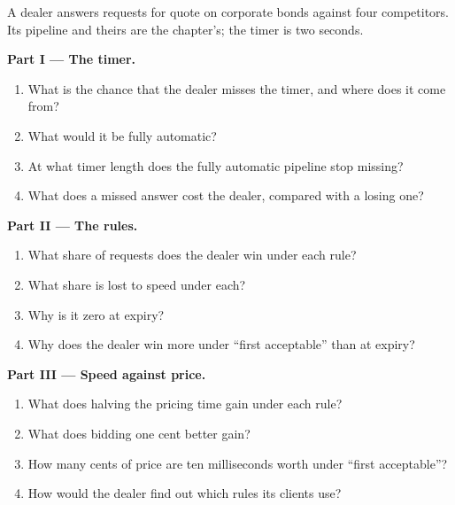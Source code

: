 \begin{problem}\label{pb:nw:fixed-income-and-rfq-platform-connectivity:1}
A dealer answers requests for quote on corporate bonds against four competitors. Its pipeline and theirs are the chapter's; the timer
is two seconds.

\medskip\noindent\textbf{Part I --- The timer.}
\begin{enumerate}
\item What is the chance that the dealer misses the timer, and where does it come from?
\item What would it be fully automatic?
\item At what timer length does the fully automatic pipeline stop missing?
\item What does a missed answer cost the dealer, compared with a losing one?
\end{enumerate}

\medskip\noindent\textbf{Part II --- The rules.}
\begin{enumerate}[resume]
\item What share of requests does the dealer win under each rule?
\item What share is lost to speed under each?
\item Why is it zero at expiry?
\item Why does the dealer win more under ``first acceptable'' than at expiry?
\end{enumerate}

\medskip\noindent\textbf{Part III --- Speed against price.}
\begin{enumerate}[resume]
\item What does halving the pricing time gain under each rule?
\item What does bidding one cent better gain?
\item How many cents of price are ten milliseconds worth under ``first acceptable''?
\item How would the dealer find out which rules its clients use?
\end{enumerate}


\end{problem}
